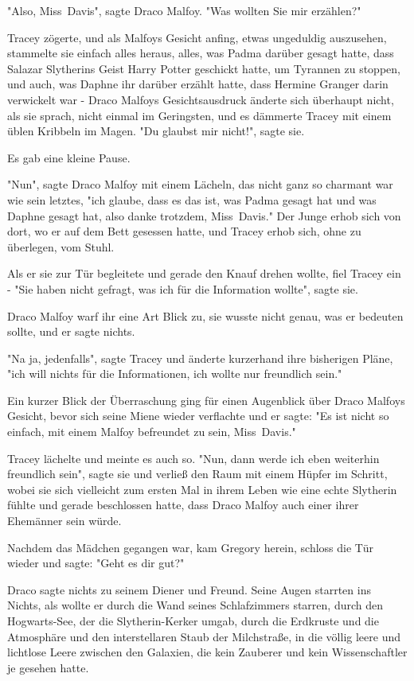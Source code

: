 {"Also, Miss~Davis", sagte Draco Malfoy. "Was wollten Sie mir erzählen?"

Tracey zögerte, und als Malfoys Gesicht anfing, etwas ungeduldig auszusehen, stammelte sie einfach alles heraus, alles, was Padma darüber gesagt hatte, dass Salazar Slytherins Geist Harry Potter geschickt hatte, um Tyrannen zu stoppen, und auch, was Daphne ihr darüber erzählt hatte, dass Hermine Granger darin verwickelt war - Draco Malfoys Gesichtsausdruck änderte sich überhaupt nicht, als sie sprach, nicht einmal im Geringsten, und es dämmerte Tracey mit einem üblen Kribbeln im Magen. "Du glaubst mir nicht!", sagte sie.

Es gab eine kleine Pause.

"Nun", sagte Draco Malfoy mit einem Lächeln, das nicht ganz so charmant war wie sein letztes, "ich glaube, dass es das ist, was Padma gesagt hat und was Daphne gesagt hat, also danke trotzdem, Miss~Davis." Der Junge erhob sich von dort, wo er auf dem Bett gesessen hatte, und Tracey erhob sich, ohne zu überlegen, vom Stuhl.

Als er sie zur Tür begleitete und gerade den Knauf drehen wollte, fiel Tracey ein - "Sie haben nicht gefragt, was ich für die Information wollte", sagte sie.

Draco Malfoy warf ihr eine Art Blick zu, sie wusste nicht genau, was er bedeuten sollte, und er sagte nichts.

"Na ja, jedenfalls", sagte Tracey und änderte kurzerhand ihre bisherigen Pläne, "ich will nichts für die Informationen, ich wollte nur freundlich sein."

Ein kurzer Blick der Überraschung ging für einen Augenblick über Draco Malfoys Gesicht, bevor sich seine Miene wieder verflachte und er sagte: "Es ist nicht so einfach, mit einem Malfoy befreundet zu sein, Miss~Davis."

Tracey lächelte und meinte es auch so. "Nun, dann werde ich eben weiterhin freundlich sein", sagte sie und verließ den Raum mit einem Hüpfer im Schritt, wobei sie sich vielleicht zum ersten Mal in ihrem Leben wie eine echte Slytherin fühlte und gerade beschlossen hatte, dass Draco Malfoy auch einer ihrer Ehemänner sein würde.

Nachdem das Mädchen gegangen war, kam Gregory herein, schloss die Tür wieder und sagte: "Geht es dir gut?"

Draco sagte nichts zu seinem Diener und Freund. Seine Augen starrten ins Nichts, als wollte er durch die Wand seines Schlafzimmers starren, durch den Hogwarts-See, der die Slytherin-Kerker umgab, durch die Erdkruste und die Atmosphäre und den interstellaren Staub der Milchstraße, in die völlig leere und lichtlose Leere zwischen den Galaxien, die kein Zauberer und kein Wissenschaftler je gesehen hatte.

}
